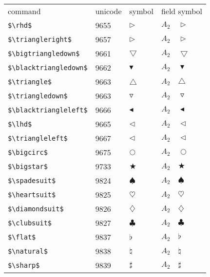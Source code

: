 \documentclass{article}
\begin{document}
\begin{table}
\begin{center}
\begin{tabular}{llll}
 command                      & unicode & symbol                & field symbol\\
 \verb#$\rhd$#                & 9655    & $\rhd$                & $A_2\quad \rhd$\\
 \verb#$\triangleright$#      & 9657    & $\triangleright$      & $A_2\quad \triangleright$\\
 \verb#$\bigtriangledown$#    & 9661    & $\bigtriangledown$    & $A_2\quad \bigtriangledown$\\
 \verb#$\blacktriangledown$#  & 9662    & $\blacktriangledown$  & $A_2\quad \blacktriangledown$\\
 \verb#$\triangle$#           & 9663    & $\triangle$           & $A_2\quad \triangle$\\
 \verb#$\triangledown$#       & 9663    & $\triangledown$       & $A_2\quad \triangledown$\\
 \verb#$\blacktriangleleft$#  & 9666    & $\blacktriangleleft$  & $A_2\quad \blacktriangleleft$\\
 \verb#$\lhd$#                & 9665    & $\lhd$                & $A_2\quad \lhd$\\
 \verb#$\triangleleft$#       & 9667    & $\triangleleft$       & $A_2\quad \triangleleft$\\
 \verb#$\bigcirc$#            & 9675    & $\bigcirc$            & $A_2\quad \bigcirc$\\
 \verb#$\bigstar$#            & 9733    & $\bigstar$            & $A_2\quad \bigstar$\\
 \verb#$\spadesuit$#          & 9824    & $\spadesuit$          & $A_2\quad \spadesuit$\\
 \verb#$\heartsuit$#          & 9825    & $\heartsuit$          & $A_2\quad \heartsuit$\\
 \verb#$\diamondsuit$#        & 9826    & $\diamondsuit$        & $A_2\quad \diamondsuit$\\
 \verb#$\clubsuit$#           & 9827    & $\clubsuit$           & $A_2\quad \clubsuit$\\
 \verb#$\flat$#               & 9837    & $\flat$               & $A_2\quad \flat$\\
 \verb#$\natural$#            & 9838    & $\natural$            & $A_2\quad \natural$\\
 \verb#$\sharp$#              & 9839    & $\sharp$              & $A_2\quad \sharp$\\

\end{tabular}
\end{center}
\end{table}
\end{document}
